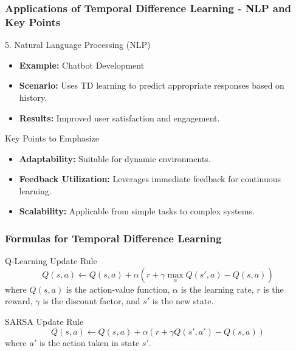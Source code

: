\documentclass[aspectratio=169]{beamer}
\begin{document}
\begin{frame}[fragile]
    \frametitle{Applications of Temporal Difference Learning - NLP and Key Points}
    \begin{block}{5. Natural Language Processing (NLP)}
        \begin{itemize}
            \item \textbf{Example:} Chatbot Development
            \item \textbf{Scenario:} Uses TD learning to predict appropriate responses based on history.
            \item \textbf{Results:} Improved user satisfaction and engagement.
        \end{itemize}
    \end{block}

    \begin{block}{Key Points to Emphasize}
        \begin{itemize}
            \item \textbf{Adaptability:} Suitable for dynamic environments.
            \item \textbf{Feedback Utilization:} Leverages immediate feedback for continuous learning.
            \item \textbf{Scalability:} Applicable from simple tasks to complex systems.
        \end{itemize}
    \end{block}
\end{frame}

\begin{frame}[fragile]
    \frametitle{Formulas for Temporal Difference Learning}
    \begin{block}{Q-Learning Update Rule}
        \begin{equation}
        Q(s, a) \gets Q(s, a) + \alpha \left( r + \gamma \max_a Q(s', a) - Q(s, a) \right)
        \end{equation}
        where \( Q(s, a) \) is the action-value function, \( \alpha \) is the learning rate, \( r \) is the reward, \( \gamma \) is the discount factor, and \( s' \) is the new state.
    \end{block}

    \begin{block}{SARSA Update Rule}
        \begin{equation}
        Q(s, a) \gets Q(s, a) + \alpha \left( r + \gamma Q(s', a') - Q(s, a) \right)
        \end{equation}
        where \( a' \) is the action taken in state \( s' \).
    \end{block}
\end{frame}
\end{document}
